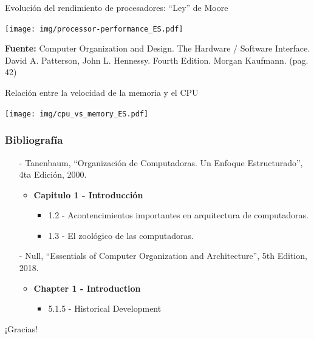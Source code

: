 \documentclass[aspectratio=169]{beamer}
\begin{document}
\begin{frame}[fragile,t]{Evolución del rendimiento de procesadores: ``Ley'' de Moore}
    \vspace{-0.3cm}
    \begin{center}
    \texttt{[image: img/processor-performance\_ES.pdf]}
    \end{center}
    \vspace{-0.5cm}
    \tiny \textbf{Fuente:} Computer Organization and Design. The Hardware / Software Interface. David A. Patterson, John L. Hennessy. Fourth Edition. Morgan Kaufmann. (pag. 42)
\end{frame}

\begin{frame}[fragile,t]{Relación entre la velocidad de la memoria y el CPU}
    \begin{center}
    \texttt{[image: img/cpu\_vs\_memory\_ES.pdf]}
    \end{center}
\end{frame}

\begin{frame}[fragile]
    \frametitle{Bibliografía}
    \begin{itemize}
     \setlength\itemsep{0.5cm}
    \item[-] \small Tanenbaum, “Organización de Computadoras. Un Enfoque Estructurado”, 4ta Edición, 2000.\\
    \begin{itemize}
     \item \textbf{Capitulo 1 - Introducción}\\
     \begin{itemize}
      \item 1.2 - Acontencimientos importantes en arquitectura de computadoras.
      \item 1.3 - El zoológico de las computadoras.
     \end{itemize}
    \end{itemize}
    \item[-] \small Null, “Essentials of Computer Organization and Architecture”, 5th Edition, 2018.\\
    \begin{itemize}
    \item \textbf{Chapter 1 - Introduction}
     \begin{itemize}
        \item 5.1.5 - Historical Development
     \end{itemize}
    \end{itemize}
    \end{itemize}
\end{frame}

\begin{frame}[plain]
    \begin{center}
    \vspace{2cm}
    \huge ¡Gracias!\\
    \vspace{2cm}
    \end{center}
\end{frame}
\end{document}
